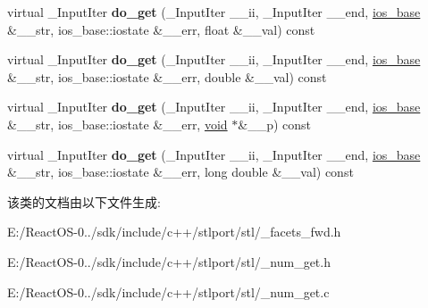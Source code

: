 \begin{DoxyCompactItemize}
virtual \+\_\+\+Input\+Iter {\bfseries do\+\_\+get} (\+\_\+\+Input\+Iter \+\_\+\+\_\+ii, \+\_\+\+Input\+Iter \+\_\+\+\_\+end, \hyperlink{classios__base}{ios\+\_\+base} \&\+\_\+\+\_\+str, ios\+\_\+base\+::iostate \&\+\_\+\+\_\+err, float \&\+\_\+\+\_\+val) const
\item 
\mbox{\label{classnum__get_a04b8a4856c828978039dbb6fccf2737a}} 
virtual \+\_\+\+Input\+Iter {\bfseries do\+\_\+get} (\+\_\+\+Input\+Iter \+\_\+\+\_\+ii, \+\_\+\+Input\+Iter \+\_\+\+\_\+end, \hyperlink{classios__base}{ios\+\_\+base} \&\+\_\+\+\_\+str, ios\+\_\+base\+::iostate \&\+\_\+\+\_\+err, double \&\+\_\+\+\_\+val) const
\item 
\mbox{\label{classnum__get_a4a8c0937fe8bf342a6f580b416b9f24e}} 
virtual \+\_\+\+Input\+Iter {\bfseries do\+\_\+get} (\+\_\+\+Input\+Iter \+\_\+\+\_\+ii, \+\_\+\+Input\+Iter \+\_\+\+\_\+end, \hyperlink{classios__base}{ios\+\_\+base} \&\+\_\+\+\_\+str, ios\+\_\+base\+::iostate \&\+\_\+\+\_\+err, \hyperlink{interfacevoid}{void} $\ast$\&\+\_\+\+\_\+p) const
\item 
\mbox{\label{classnum__get_a93e9e2ecb070402eb97228f31af04c60}} 
virtual \+\_\+\+Input\+Iter {\bfseries do\+\_\+get} (\+\_\+\+Input\+Iter \+\_\+\+\_\+ii, \+\_\+\+Input\+Iter \+\_\+\+\_\+end, \hyperlink{classios__base}{ios\+\_\+base} \&\+\_\+\+\_\+str, ios\+\_\+base\+::iostate \&\+\_\+\+\_\+err, long double \&\+\_\+\+\_\+val) const
\end{DoxyCompactItemize}


该类的文档由以下文件生成\+:\begin{DoxyCompactItemize}
\item 
E\+:/\+React\+O\+S-\/0../sdk/include/c++/stlport/stl/\+\_\+facets\+\_\+fwd.\+h\item 
E\+:/\+React\+O\+S-\/0../sdk/include/c++/stlport/stl/\+\_\+num\+\_\+get.\+h\item 
E\+:/\+React\+O\+S-\/0../sdk/include/c++/stlport/stl/\+\_\+num\+\_\+get.\+c\end{DoxyCompactItemize}
